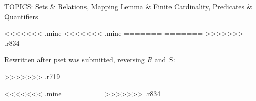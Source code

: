 \documentclass[handout]{mcs}
\begin{document}
\renewcommand{\reading}{Chapter~\bref{sets_chap}, \emph{Mathematical
    Data Types}; Chapter~\bref{logic_chap}, \emph{First-Order Logic}.
  (Assigned readings do not include the Problem sections.)

\emph{Reminder}: Comments on the reading using the \emph{NB online
  annotation system} are due at times indicated in the online tutor
problem set TP.3.  Reading Comments count for 5\% of the final grade.}


\begin{staffnotes}
TOPICS: Sets \& Relations, Mapping Lemma \& Finite Cardinality,
Predicates \& Quantifiers
\end{staffnotes}


<<<<<<< .mine
<<<<<<< .mine
=======
=======
>>>>>>> .r834

\begin{staffnotes}
\newpage
Rewritten after pset was submitted, reversing $R$ and $S$:
\end{staffnotes}

>>>>>>> .r719

<<<<<<< .mine
=======
>>>>>>> .r834


\end{document}

